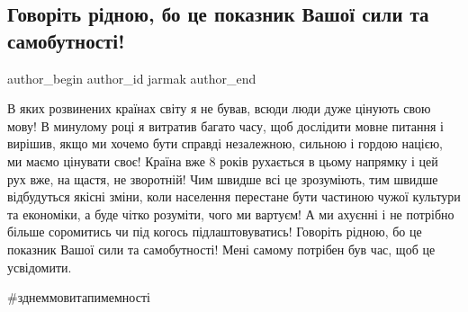  
 
 
 
 
 
\subsection{Говоріть рідною, бо це показник Вашої сили та самобутності!}
\label{sec:09_11_2021.fb.jarmak.1.govorit_ridnoju}
 
\ifcmt
 author_begin
   author_id jarmak
 author_end
\fi

В яких розвинених країнах світу я не бував, всюди люди дуже цінують свою мову!
В минулому році я витратив багато часу, щоб дослідити мовне питання і вирішив,
якщо ми хочемо бути справді незалежною, сильною і гордою нацією, ми маємо
цінувати своє! Країна вже 8 років рухається в цьому напрямку і цей рух вже, на
щастя, не зворотній! Чим швидше всі це зрозуміють, тим швидше відбудуться
якісні зміни, коли населення перестане бути частиною чужої культури та
економіки, а буде чітко розуміти, чого ми вартуєм! А ми ахуєнні і не потрібно
більше соромитись чи під когось підлаштовуватись! Говоріть рідною, бо це
показник Вашої сили та самобутності! Мені самому потрібен був час, щоб це
усвідомити. 


\#зднеммовитапимемності

